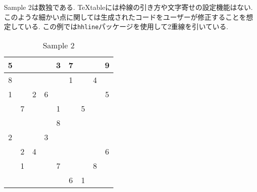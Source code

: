 \documentclass{jsarticle}
\begin{document}
Sample 2は数独である.
TeXtableには枠線の引き方や文字寄せの設定機能はない.
このような細かい点に関しては生成されたコードをユーザーが修正することを想定している.
この例では\verb|hhline|パッケージを使用して2重線を引いている.
\vspace{-0.5em}
\begin{table}[htb]
	\captionsetup{labelformat=empty,labelsep=none}
	\caption{Sample 2}
	\label{sample2}
	\centering
	\begin{tabular}{|c|c|c||c|c|c||c|c|c|}\hline
		5	&	&	&	&3	&7	&	&	&9	\\ \hline
		8	&	&	&	&	&1	&	&4	&	\\ \hline
		1	&	&2	&6	&	&	&	&	&5	\\ \hhline{|=|=|=#=|=|=#=|=|=|}
			&7	&	&	&1	&	&5	&	&	\\ \hline
			&	&	&	&8	&	&	&	&	\\ \hline
		2	&	&	&3	&	&	&	&	&	\\ \hhline{|=|=|=#=|=|=#=|=|=|}
			&2	&4	&	&	&	&	&	&6	\\ \hline
			&1	&	&	&7	&	&	&8	&	\\ \hline
			&	&	&	&	&6	&1	&	&	\\ \hline
	\end{tabular}
\end{table}
\end{document}
